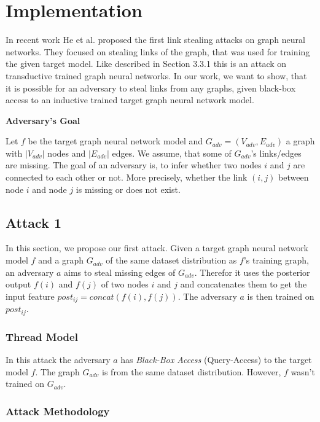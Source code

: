 \chapter{Implementation}

  In recent work He et al. \cite{DBLP:journals/corr/abs-2005-02131} proposed the first link stealing attacks on graph neural networks.
  They focused on stealing links of the graph, that was used for training the given target model.
  Like described in Section 3.3.1 this is an attack on transductive trained graph neural networks.
  In our work, we want to show, that it is possible for an adversary to steal links from any graphs, given black-box access to an inductive trained target graph neural network model.

  \textbf{Adversary's Goal}

  Let $f$ be the target graph neural network model and $G_{adv} = (V_{adv}, E_{adv})$ a graph with $|V_{adv}|$ nodes and $|E_{adv}|$ edges. 
  We assume, that some of $G_{adv}$'s links/edges are missing.
  The goal of an adversary is, to infer whether two nodes $i$ and $j$ are connected to each other or not.
  More precisely, whether the link $(i,j)$ between node $i$ and node $j$ is missing or does not exist.
  

  \section{Attack 1}

    In this section, we propose our first attack. 
    Given a target graph neural network model $f$ and a graph $G_{adv}$ of the same dataset distribution as $f$'s training graph, an adversary $a$ aims to steal missing edges of $G_{adv}$.
    Therefor it uses the posterior output $f(i)$ and $f(j)$ of two nodes $i$ and $j$ and concatenates them to get the input feature $post_{ij} = concat(f(i),f(j))$. The adversary $a$ is then trained on $post_{ij}$.

    \subsection{Thread Model}

      In this attack the adversary $a$ has \emph{Black-Box Access} (Query-Access) to the target model $f$. 
      The graph $G_{adv}$ is from the same dataset distribution. 
      However, $f$ wasn't trained on $G_{adv}$.

    \subsection{Attack Methodology}

